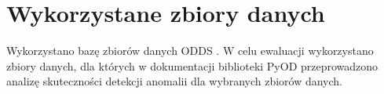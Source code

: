 \section{Wykorzystane zbiory danych }
Wykorzystano bazę zbiorów danych ODDS \cite{ODDS}. W celu ewaluacji wykorzystano zbiory danych, dla których w dokumentacji biblioteki PyOD przeprowadzono analizę skuteczności detekcji anomalii dla wybranych zbiorów danych.

